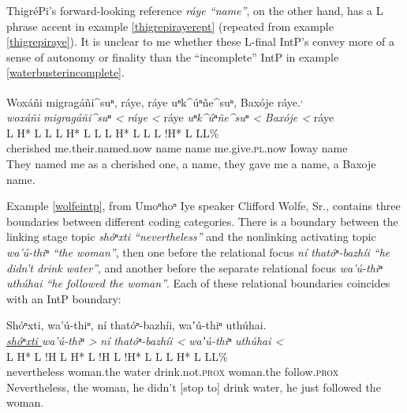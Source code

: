 \documentclass[output=paper]{LSP/langsci}
\begin{document}
ThigréPi’s forward-looking reference \emph{ráye “name”}, on the other hand, has a L phrase accent in example \ref{thigrepirayerept} (repeated from example \ref{thigrepiraye}). It is unclear to me whether these L-final IntP’s convey more of a sense of autonomy or finality than the “incomplete” IntP in example \ref{waterbusterincomplete}.

\ea\label{thigrepirayerept}
Woxáñi migragáñi\^{}suⁿ, ráye, ráye uⁿk\^{}úⁿñe\^{}suⁿ, Baxóje ráye.\footnotemark\textsuperscript{,} \footnotemark\\
\glll	\emph{woxáñi} 	\emph{migragáñi\^{}suⁿ <}		\emph{ráye <}	ráye		\emph{uⁿk\^{}úⁿñe\^{}suⁿ <}	\emph{Baxóje <}		ráye\\
	{\ob L H* L}		{L\cb}	{\ob L H* L L\cb}	{\ob L H* L}	{L\cb}	{\ob L !H* L} 		{L\cb{}L\%}\\
	cherished		me.their.named.now			name			name		me.give.\textsc{pl}.now		Ioway				name\\
\glt	They named me as a cherished one, a name, they gave me a name, a Baxoje name.
\z

Example \ref{wolfeintp}, from Umoⁿhoⁿ Iye speaker Clifford Wolfe, Sr., contains three boundaries between different coding categories. There is a boundary between the linking stage topic \emph{shóⁿxti “nevertheless”} and the nonlinking activating topic \emph{wa’ú-thiⁿ “the woman”}, then one before the relational focus \emph{ní thatóⁿ-bazhíi “he didn’t drink water”}, and another before the separate relational focus \emph{wa’ú-thiⁿ uthúhai “he followed the woman”}. Each of these relational boundaries coincides with an IntP boundary:

\ea\label{wolfeintp}
 	Shóⁿxti, wa’ú-thiⁿ, ní thatóⁿ-bazhíi, waʼú-thiⁿ uthúhai.\footnotemark\\
\glll	\emph{\underline{shóⁿxti }}	\emph{wa’ú-thiⁿ >}		\emph{ní} 		\emph{thatóⁿ-bazhíi <}		\emph{waʼú-thiⁿ} 	\emph{uthúhai <}\\
	{\ob L H* L !H\cb}			{\ob L H* L !H\cb}		{\ob L}		{!H* L L\cb}	{\ob L H* L}		{L\cb{}L\%}\\
	nevertheless				woman.the			water			drink.not.\textsc{prox} 		woman.the		follow.\textsc{prox}\\
\glt	Nevertheless, the woman, he didn’t [stop to] drink water, he just followed the woman. 
\z
\end{document}
